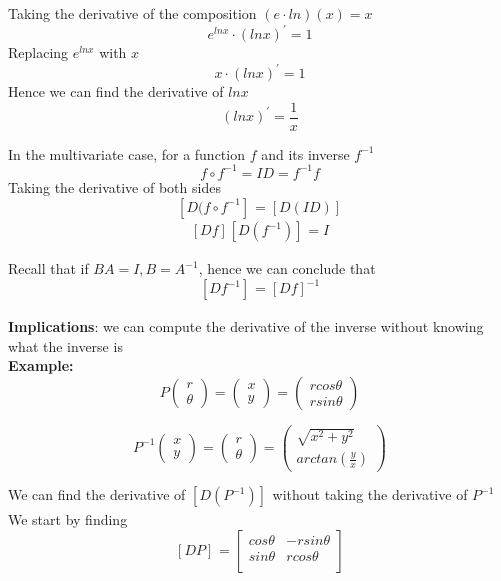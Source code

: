 Taking the derivative of the composition $(e \cdot ln)(x) = x$
\[
   e^{lnx} \cdot (lnx) ^{\prime} = 1
\] 
Replacing $e^{lnx}$ with $x$ 
\[
  x \cdot (lnx) ^{\prime} = 1
\] 
Hence we can find the derivative of $lnx$ 
\[
   (lnx) ^{\prime} = \frac{1}{x}
\] 

In the multivariate case, for a function $f$ and its inverse $f^{-1}$
 \[
    f \circ f^{-1} = ID = f^{-1} f
\] 
Taking the derivative of both sides
\[
   \left[ D (f \circ f^{-1} \right]_{} = \left[ D (ID) \right]_{} 
\] 
\[
   \left[ D f \right]_{}  \left[ D (f^{-1}) \right]_{}  = I
\] 

Recall that if $BA = I, B = A^{-1}$, hence we can conclude that \[
   \left[ D f^{-1} \right]_{} = \left[ D f \right]_{}^{-1}
\] 

\textbf{Implications}: we can compute the derivative of the inverse without knowing what the inverse is \\

\textbf{Example:}
\[
  P \begin{pmatrix} r \\ \theta \end{pmatrix}  = \begin{pmatrix} x \\y \end{pmatrix} = \begin{pmatrix} r cos \theta \\ r sin \theta \end{pmatrix} 
\] 

\[
   P^{-1} \begin{pmatrix} x \\y \end{pmatrix}  = \begin{pmatrix} r \\ \theta \end{pmatrix} = \begin{pmatrix} \sqrt{x^2 + y^2}  \\ arctan( \frac{y}{x})\end{pmatrix} 
\] 

We can find the derivative  of $\left[ D (P^{-1}) \right]_{} $ without taking the derivative of $P^{-1}$ \\

We start by finding 
\[
  \left[ D P \right]_{} = \begin{bmatrix} 
     cos \theta & -r sin \theta \\  
     sin \theta & r cos \theta \\  
  \end{bmatrix}
\] 

